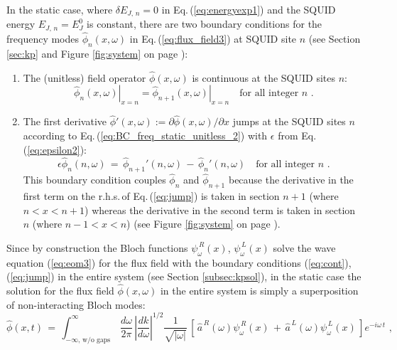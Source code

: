 \noindent
In the static case, where  $\delta E_{J,\,n} = 0$ in Eq.\,(\ref{eq:energyexp1})
and the SQUID energy $E_{J,\,n} = E_J^0$ is constant, 
there are two boundary conditions for the frequency modes $\hat{\phi}_n(x,\omega)$ 
in Eq.\,(\ref{eq:flux_field3}) at SQUID site $n$ (see Section \ref{sec:kp} and 
Figure \ref{fig:system} on page \pageref{fig:system}):
%
\begin{enumerate}
    \item The (unitless) field operator $\hat{\phi}(x,\omega)$ is continuous at the 
    SQUID sites $n$:
    \begin{equation} \label{eq:cont}
    \left. \hat{\phi}_n(x,\omega) \right|_{x=n} = 
    \left. \hat{\phi}_{n+1}(x,\omega) \right|_{x=n} \quad \text{for all integer} \, \, n \, \, .
    \end{equation}
    \item The first derivative $\hat{\phi}'(x,\omega) := \partial \hat{\phi}(x,\omega) / \partial x$
    jumps at the SQUID sites $n$ 
    according to Eq.\,(\ref{eq:BC_freq_static_unitless_2}) with $\epsilon$ from 
    Eq.\,(\ref{eq:epsilon2}):
    \begin{equation}\label{eq:jump}
    \epsilon \hat{\phi}_n(n, \omega) \, = \, \hat{\phi}_{n+1}'(n,\omega) \, - \, \hat{\phi}_n'(n,\omega) 
    \quad \text{for all integer} \, \, n \, \, .
    \end{equation}
    This boundary condition couples $\hat{\phi}_n$ and $\hat{\phi}_{n+1}$
    because the derivative in the first term on the r.h.s.\,of Eq.\,(\ref{eq:jump}) 
    is taken in section $n+1$ (where $n < x < n+1$)
    whereas the derivative in the second term is taken in section $n$ (where $n-1 < x < n$)
    (see Figure \ref{fig:system} on page \pageref{fig:system}).
\end{enumerate}
%
Since by construction the Bloch functions $\psi_{\omega}^{\,R}(x)$, $\psi_{\omega}^{\,L}(x)$ 
solve the wave equation (\ref{eq:eom3}) for the flux field with the boundary conditions 
(\ref{eq:cont}), (\ref{eq:jump})
in the entire system (see Section \ref{subsec:kpsol}), in the static case 
the solution for the 
flux field $\hat{\phi}(x,\omega)$ in the entire system is simply a superposition of non-interacting Bloch modes:
%
\begin{equation} \label{eq:flux_field_static}
    \hat{\phi}(x,t) \, = \, 
    \displaystyle{
    \int_{-\infty, \, \text{w/o gaps}}^{\infty} \, \frac{d\omega}{2 \pi} \, \left| \frac{d k}{d \omega} \right|^{1/2}
        \frac{1}{\sqrt{|\omega|}}} \,
    \left[ \, \hat{a}^{\,R}(\omega) \psi_{\omega}^{\,R}(x) \, + \, 
    \hat{a}^{\,L}(\omega) \psi_{\omega}^{\,L}(x)  \, \right] e^{-i \omega \, t} \, \, ,
\end{equation}
%

